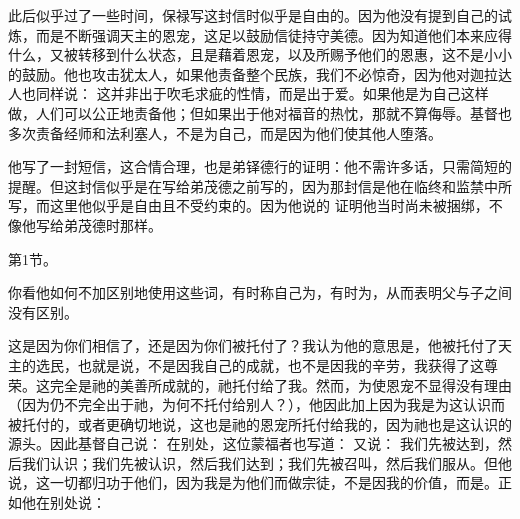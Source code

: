 此后似乎过了一些时间，保禄写这封信时似乎是自由的。因为他没有提到自己的试炼，而是不断强调天主的恩宠，这足以鼓励信徒持守美德。因为知道他们本来应得什么，又被转移到什么状态，且是藉着恩宠，以及所赐予他们的恩惠，这不是小小的鼓励。他也攻击犹太人，如果他责备整个民族，我们不必惊奇，因为他对迦拉达人也同样说：  这并非出于吹毛求疵的性情，而是出于爱。如果他是为自己这样做，人们可以公正地责备他；但如果出于他对福音的热忱，那就不算侮辱。基督也多次责备经师和法利塞人，不是为自己，而是因为他们使其他人堕落。\par

他写了一封短信，这合情合理，也是弟铎德行的证明：他不需许多话，只需简短的提醒。但这封信似乎是在写给弟茂德之前写的，因为那封信是他在临终和监禁中所写，而这里他似乎是自由且不受约束的。因为他说的  证明他当时尚未被捆绑，不像他写给弟茂德时那样。\par

第1节。 \par

你看他如何不加区别地使用这些词，有时称自己为，有时为，从而表明父与子之间没有区别。\par

\par

这是因为你们相信了，还是因为你们被托付了？我认为他的意思是，他被托付了天主的选民，也就是说，不是因我自己的成就，也不是因我的辛劳，我获得了这尊荣。这完全是祂的美善所成就的，祂托付给了我。然而，为使恩宠不显得没有理由（因为仍不完全出于祂，为何不托付给别人？），他因此加上因为我是为这认识而被托付的，或者更确切地说，这也是祂的恩宠所托付给我的，因为祂也是这认识的源头。因此基督自己说：  在别处，这位蒙福者也写道：  又说：  我们先被达到，然后我们认识；我们先被认识，然后我们达到；我们先被召叫，然后我们服从。但他说，这一切都归功于他们，因为我是为他们而做宗徒，不是因我的价值，而是。正如他在别处说： \par

